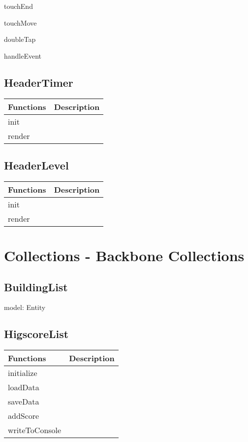   	touchEnd

  	touchMove

  	doubleTap

  	handleEvent

\subsection*{HeaderTimer}

	\begin{table}[H]
	\begin{tabular}{p{4cm} | p{8cm} }
	\hline
	\rowcolor{gray}
	Functions & Description \\ \hline
	init & \\ \hline
	render & \\ \hline
	\end{tabular}
	\end{table}

\subsection*{HeaderLevel}

	\begin{table}[H]
	\begin{tabular}{p{4cm} | p{8cm} }
	\hline
	\rowcolor{gray}
	Functions & Description \\ \hline
	init & \\ \hline
	render & \\ \hline
	\end{tabular}
	\end{table}

\clearpage

\section{Collections - Backbone Collections}
	
\subsection*{BuildingList}

	model: Entity

\subsection*{HigscoreList}

	\begin{table}[H]
	\begin{tabular}{p{4cm} | p{8cm} }
	\hline
	\rowcolor{gray}
	Functions & Description \\ \hline
	initialize & \\ \hline
	loadData & \\ \hline
	saveData & \\ \hline
	addScore & \\ \hline
	writeToConsole & \\ \hline

	\end{tabular}
	\end{table}

